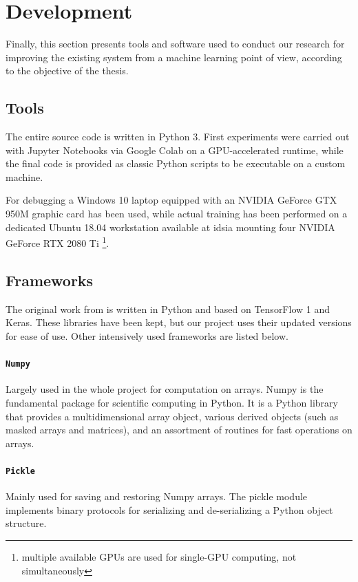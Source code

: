 \section{Development}
\label{sec:software}

Finally, this section presents tools and software used to conduct our research for improving the existing system from a machine learning point of view, according to the objective of the thesis.



\subsection{Tools}
\label{subsec:tools}

The entire source code is written in Python 3. First experiments were carried out with Jupyter Notebooks via Google Colab on a GPU-accelerated runtime, while the final code is provided as classic Python scripts to be executable on a custom machine.

For debugging a Windows 10 laptop equipped with an NVIDIA GeForce GTX 950M graphic card has been used, while actual training has been performed on a dedicated Ubuntu 18.04 workstation available at \gls{idsia} mounting four NVIDIA GeForce RTX 2080 Ti \footnote{multiple available GPUs are used for single-GPU computing, not simultaneously}.



\subsection{Frameworks}
\label{subsec:frameworks}

The original work from \cite{mantegazza2019visionbased} is written in Python and based on TensorFlow 1 and Keras. These libraries have been kept, but our project uses their updated versions for ease of use. Other intensively used frameworks are listed below.


\paragraph*{\texttt{Numpy}}
Largely used in the whole project for computation on arrays. Numpy is the fundamental package for scientific computing in Python. It is a Python library that provides a multidimensional array object, various derived objects (such as masked arrays and matrices), and an assortment of routines for fast operations on arrays. 

\paragraph*{\texttt{Pickle}}
Mainly used for saving and restoring Numpy arrays. The pickle module implements binary protocols for serializing and de-serializing a Python object structure. 

